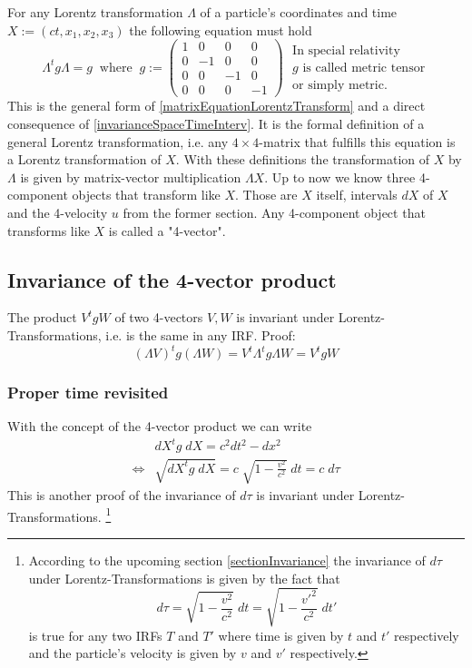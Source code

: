 \documentclass{article}
\begin{document}
For any Lorentz transformation $\Lambda$ of a particle's coordinates and time $X := (c t,x_1,x_2,x_3)$ the following equation must hold
\begin{equation} \label{generalConditionForLorentzTransformations}
\Lambda^t g \Lambda = g \;\; \text{where} \;\;
g :=
\begin{pmatrix}
    1 & 0 & 0 & 0
    \\
    0 & -1 & 0 & 0
    \\
    0 & 0 & -1 & 0
    \\
    0 & 0 & 0 & -1
\end{pmatrix}
\;\begin{array}{c}\text{In special relativity} \\ \text{$g$ is called metric tensor} \\ \text{or simply metric.}\end{array}
\end{equation}
This is the general form of \ref{matrixEquationLorentzTransform} and a direct consequence of \ref{invarianceSpaceTimeInterv}.
It is the formal definition of a general Lorentz transformation, i.e. any $4 \times 4$-matrix that fulfills this equation is a Lorentz transformation of $X$.
With these definitions the transformation of $X$ by $\Lambda$ is given by matrix-vector multiplication $\Lambda X$.
Up to now we know three 4-component objects that transform like $X$.
Those are $X$ itself, intervals $dX$ of $X$ and the 4-velocity $u$ from the former section.
Any 4-component object that transforms like $X$ is called a "4-vector".

\subsection{Invariance of the 4-vector product} \label{invarianceOf4VectorProduct}
The product $V^t g W$ of two 4-vectors $V,W$ is invariant under Lorentz-Transformations, i.e. is the same in any IRF.
Proof:
\begin{equation}
    (\Lambda V)^t g (\Lambda W) = V^t \Lambda^t g \Lambda W = V^t g W
\end{equation}

\subsubsection{Proper time revisited}
With the concept of the 4-vector product we can write
\begin{align}
    & dX^{t} g \; dX = c^2 dt^2 - dx^2 \\
    \iff & \sqrt{dX^{t} g \; dX} = c \; \sqrt{1-\frac{v^2}{c^2}} \; dt = c \; d\tau
\end{align}
This is another proof of the invariance of $d\tau$ is invariant under Lorentz-Transformations.
\footnote{
According to the upcoming section \ref{sectionInvariance} the invariance of $d\tau$ under Lorentz-Transformations is given by the fact that
\begin{equation}
    d\tau = \sqrt{1-\frac{v^2}{c^2}} \; dt = \sqrt{1-\frac{v'^2}{c^2}} \; dt'
\end{equation}
is true for any two IRFs $T$ and $T'$ where time is given by $t$ and $t'$ respectively and the particle's velocity is given by $v$ and $v'$ respectively.
}
\end{document}
